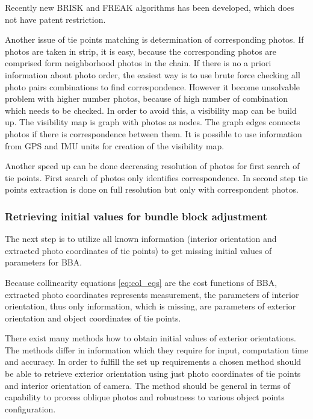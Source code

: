 \documentclass[a4paper,12pt]{article}
\begin{document}
Recently new BRISK \cite{leutenegger2011brisk} and FREAK \cite{alahi2012freak} algorithms
has been developed, which does not have patent restriction. 

Another issue of tie points matching is determination of corresponding photos. 
If photos are taken in strip, it is easy, because the corresponding photos are comprised form neighborhood photos 
in the chain.
If there is no a priori information about photo order, the easiest way is to use brute force 
checking all photo pairs combinations to find correspondence.
However it become unsolvable problem with higher number photos, because 
of high number of combination which needs to be checked. In order to avoid this, a visibility map \cite{barazzetti2010extraction} can be build up. 
The visibility map is graph with photos as nodes. The graph edges connects photos if there is
correspondence between them.  It is possible to use information from GPS and IMU units for creation of the visibility map.

Another speed up can be done decreasing resolution of photos 
for first search of tie points. First search of photos only identifies correspondence.
In second step tie points extraction is done on full resolution but only with correspondent photos.

\subsubsection{Retrieving initial values for bundle block adjustment}

The next step is to utilize all known information (interior orientation and extracted 
photo coordinates of tie points) to get missing initial values of parameters for BBA. 

Because collinearity equations \eqref{eq:col_eqs} are the cost functions of BBA,
extracted photo coordinates represents measurement,
the parameters of interior orientation, thus only information, 
which is missing, are parameters of exterior orientation and object coordinates of 
tie points. 


There exist many methods how to obtain initial values of exterior orientations. The methods 
differ in information which they require for input, computation time and accuracy. 
In order to fulfill the set up requirements a chosen method should be able to retrieve exterior orientation 
using just photo coordinates of tie points and interior orientation of camera. The method 
should be general in terms of capability to process oblique photos and robustness to 
various object points configuration.
\end{document}
